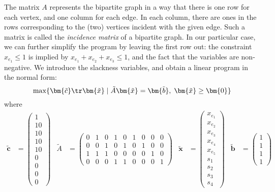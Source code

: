 The matrix  $A$ represents the bipartite graph in a way that there is one row for each vertex, and one column for
each edge. In each column, there are ones in the rows corresponding to the (two) vertices incident with the given 
edge. Such a matrix is called the {\em incidence matrix} of a bipartite graph. In our particular case, we can further
simplify the program by leaving the first row out: the constraint $x_{e_1}\le1$ is implied by 
$x_{e_1}+x_{e_2}+x_{e_3}\le1$, and the fact that the variables are non-negative.
We introduce the slackness variables, and obtain a linear program in the normal form:
\begin{equation}
  \label{eq:ILPa:3}
  \max\{\bm{\tilde{c}}\tr\bm{\tilde{x}}\mid \tilde{A}\bm{\tilde{x}}=\bm{\tilde{b}},\;\bm{\tilde{x}}\ge\bm{0}\}
\end{equation}
where
\begin{align*}
\bm{\tilde{c}}&=\left(\begin{array}{c}1\\10\\10\\10\\10\\0\\0\\0\\0\end{array}\right)&
\tilde{A}&=\left(\begin{array}{ccccccccc}0&1&0&1&0&1&0&0&0\\0&0&1&0&1&0&1&0&0\\1&1&1&0&0&0&0&1&0\\0&0&0&1&1&0&0&0&1\end{array}\right)&
\bm{\tilde{x}}&=\left(\begin{array}{c}x_{e_1}\\x_{e_2}\\x_{e_3}\\x_{e_4}\\x_{e_5}\\s_1\\s_2\\s_3\\s_4\end{array}\right)&
\bm{\tilde{b}}&=\left(\begin{array}{c}1\\1\\1\\1\end{array}\right)
\end{align*}

